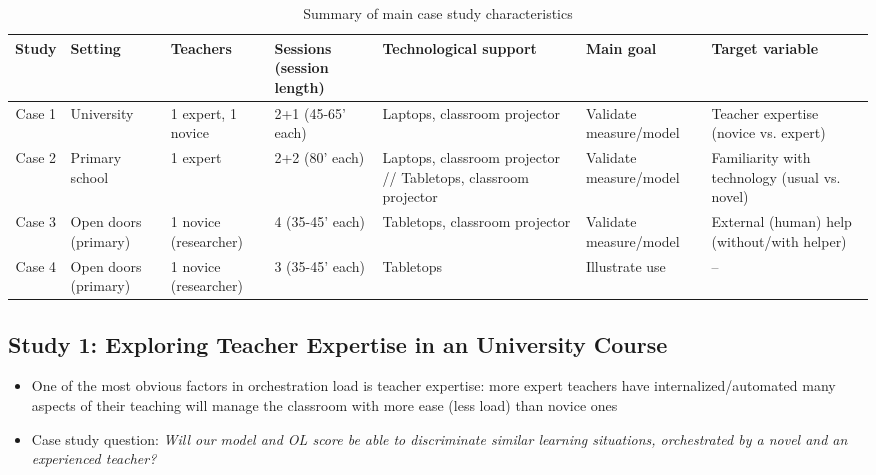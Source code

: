 \documentclass[10pt,journal,compsoc]{IEEEtran}
\begin{document}
\begin{table}[!t]
\caption{Summary of main case study characteristics}
\label{tab:cases}
\centering
\begin{tabular}{|c||p{1.5cm}|p{1.5cm}|p{2cm}|p{3.4cm}|p{2cm}|p{3.4cm}|}
\hline
Study & Setting & Teachers & Sessions (session length) & Technological support & Main goal & Target variable\\
\hline
\hline
Case 1 & University & 1 expert, 1 novice & 2+1 (45-65' each) & Laptops, classroom projector & Validate measure/model & Teacher expertise (novice vs. expert) \\
\hline
Case 2 & Primary school & 1 expert & 2+2 (80' each) & Laptops, classroom projector // Tabletops, classroom projector & Validate measure/model & Familiarity with technology (usual vs. novel) \\
\hline
Case 3 & Open doors (primary) & 1 novice (researcher) & 4 (35-45' each) & Tabletops, classroom projector & Validate measure/model & External (human) help (without/with helper) \\
\hline
Case 4 & Open doors (primary) & 1 novice (researcher) & 3 (35-45' each) & Tabletops & Illustrate use & -- \\
\hline
\end{tabular}
\end{table}



\subsection{Study 1: Exploring Teacher Expertise in an University Course}

\begin{itemize}
\item One of the most obvious factors in orchestration load is teacher expertise: more expert teachers have internalized/automated many aspects of their teaching \cite{prieto2011recurrent,feldon2007cognitive} will manage the classroom with more ease (less load) than novice ones
\item Case study question: \textit{Will our model and OL score be able to discriminate similar learning situations, orchestrated by a novel and an experienced teacher?}
\end{itemize}
\end{document}
